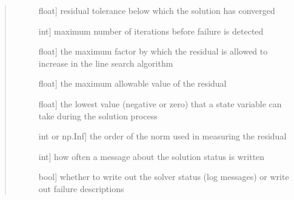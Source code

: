 \documentclass[letterpaper,10pt,english]{sphinxmanual}
\begin{document}
\begin{fulllineitems}
\begin{fulllineitems}
\begin{quote}
\begin{description}
\begin{description}
\item[{}] \leavevmode{[}float{]}
residual tolerance below which the solution has converged

\item[{}] \leavevmode{[}int{]}
maximum number of iterations before failure is detected

\item[{}] \leavevmode{[}float{]}
the maximum factor by which the residual is allowed to increase in the line search algorithm

\item[{}] \leavevmode{[}float{]}
the maximum allowable value of the residual

\item[{}] \leavevmode{[}float{]}
the lowest value (negative or zero) that a state variable can take during the solution process

\item[{}] \leavevmode{[}int or np.Inf{]}
the order of the norm used in measuring the residual

\item[{}] \leavevmode{[}int{]}
how often a message about the solution status is written

\item[{}] \leavevmode{[}bool{]}
whether to write out the solver status (log messages) or write out failure descriptions

\end{description}

\end{description}\end{quote}

\end{fulllineitems}



\end{fulllineitems}
\end{document}
